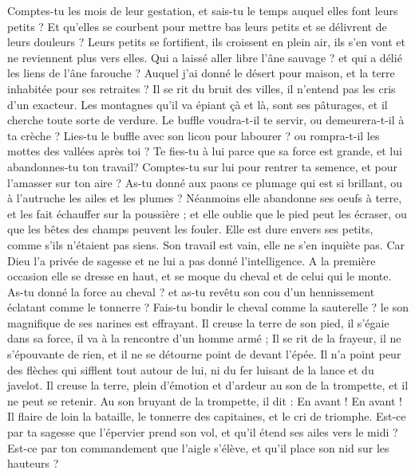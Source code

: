 \begin{multicols}{2}
Comptes-tu les mois de leur gestation, et sais-tu le temps auquel elles font leurs petits ?
Et qu'elles se courbent pour mettre bas leurs petits et se délivrent de leurs douleurs ?
Leurs petits se fortifient, ils croissent en plein air, ils s’en vont et ne reviennent plus vers elles.
Qui a laissé aller libre l’âne sauvage ? et qui a délié les liens de l’âne farouche ?
Auquel j’ai donné le désert pour maison, et la terre inhabitée pour ses retraites ?
Il se rit du bruit des villes, il n'entend pas les cris d'un exacteur.
Les montagnes qu'il va épiant çà et là, sont ses pâturages, et il cherche toute sorte de verdure. 
Le buffle voudra-t-il te servir, ou demeurera-t-il à ta crèche ? 
Lies-tu le buffle avec son licou pour labourer ? ou rompra-t-il les mottes des vallées après toi ? 
Te fies-tu à lui parce que sa force est grande, et lui abandonnes-tu ton travail? 
Comptes-tu sur lui pour rentrer ta semence, et pour l'amasser sur ton aire ? 
As-tu donné aux paons ce plumage qui est si brillant, ou à l'autruche les ailes et les plumes ? 
Néanmoins elle abandonne ses oeufs à terre, et les fait échauffer sur la poussière ;
et elle oublie que le pied peut les écraser, ou que les bêtes des champs peuvent les fouler. 
Elle est dure envers ses petits, comme s’ils n’étaient pas siens. Son travail est vain, elle ne s’en inquiète pas.
Car Dieu l'a privée de sagesse et ne lui a pas donné l'intelligence.
A la première occasion elle se dresse en haut, et se moque du cheval et de celui qui le monte. 
As-tu donné la force au cheval ? et as-tu revêtu son cou d'un hennissement éclatant comme le tonnerre ? 
Fais-tu bondir le cheval comme la sauterelle ? le son magnifique de ses narines est effrayant.
Il creuse la terre de son pied, il s'égaie dans sa force, il va à la rencontre d'un homme armé ;
Il se rit de la frayeur, il ne s'épouvante de rien, et il ne se détourne point de devant l'épée.
Il n'a point peur des flèches qui sifflent tout autour de lui, ni du fer luisant de la lance et du javelot. 
Il creuse la terre, plein d'émotion et d'ardeur au son de la trompette, et il ne peut se retenir. 
Au son bruyant de la trompette, il dit : En avant ! En avant ! Il flaire de loin la bataille, le tonnerre des capitaines, et le cri de triomphe.
Est-ce par ta sagesse que l'épervier prend son vol, et qu'il étend ses ailes vers le midi ?
Est-ce par ton commandement que l'aigle s'élève, et qu'il place son nid sur les hauteurs ?

\end{multicols}
